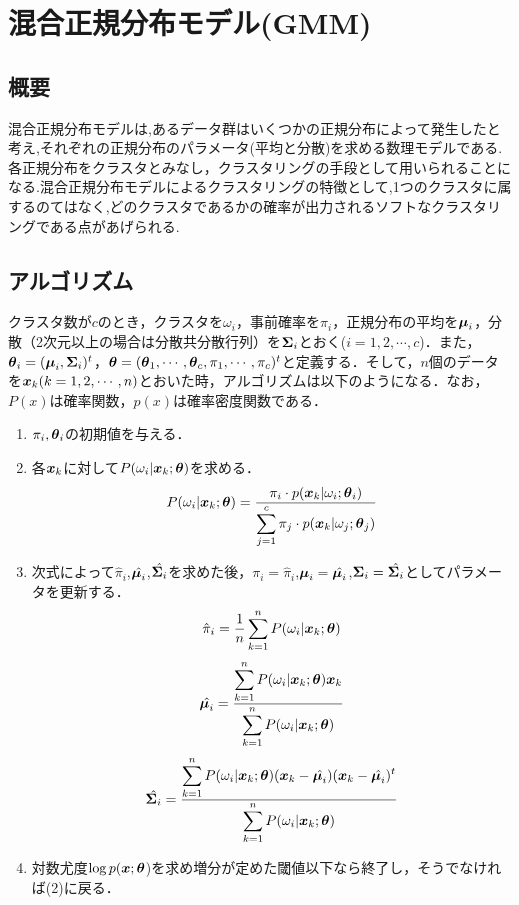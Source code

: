 \documentclass[a4j]{jsarticle}
\def\vec#1{\mbox{\boldmath $#1$}}
\begin{document}
\section{混合正規分布モデル(GMM)}
\subsection{概要}
混合正規分布モデルは,あるデータ群はいくつかの正規分布によって発生したと考え,それぞれの正規分布のパラメータ(平均と分散)を求める数理モデルである.
各正規分布をクラスタとみなし，クラスタリングの手段として用いられることになる.混合正規分布モデルによるクラスタリングの特徴として,1つのクラスタに属するのてはなく,どのクラスタであるかの確率が出力されるソフトなクラスタリングである点があげられる.

\subsection{アルゴリズム}
\label{sec:gmm_algo}
クラスタ数が$c$のとき，クラスタを$\omega_i$，事前確率を$\pi_i$，正規分布の平均を$\vec\mu_i$，分散（2次元以上の場合は分散共分散行列）を$\vec\Sigma_i$とおく($i=1,2,\cdots,c$)．また，$\vec\theta_i = (\vec\mu_i,\vec\Sigma_i)^t$，$\vec\theta = (\vec\theta_1,\cdots,\vec\theta_c,\pi_1,\cdots,\pi_c)^t$と定義する．そして，$n$個のデータを$\vec x_k(k=1,2,\cdots,n)$とおいた時，アルゴリズムは以下のようになる．なお，$P(x)$は確率関数，$p(x)$は確率密度関数である．
\begin{enumerate}
\item $\pi_i,\vec\theta_i$の初期値を与える．
\item 各$\vec x_k$に対して$P(\omega_i|\vec x_k;\vec\theta)$を求める．
\begin{equation}
	\label{eq:gmm_cls}
P(\omega_i|\vec x_k;\vec\theta)
=\frac{\pi_i\cdot p(\vec x_k|\omega_i;\vec\theta_i)}{\displaystyle\sum_{j=1}^{c} \pi_j\cdot p(\vec x_k|\omega_j;\vec\theta_j)}
\end{equation}
\item 次式によって$\hat\pi_i$,$\hat{\vec\mu_i}$,$\hat{\vec\Sigma_i}$を求めた後，$\pi_i = \hat\pi_i$,$\vec\mu_i = \hat{\vec\mu_i}$,$\vec\Sigma_i = \hat{\vec\Sigma_i}$としてパラメータを更新する．
\begin{equation}
\label{eq:gmm_pi}
\hat\pi_i = \frac{1}{n}\displaystyle\sum_{k=1}^{n} P(\omega_i|\vec x_k;\vec\theta)
\end{equation}
\begin{equation}
	\label{eq:gmm_mu}
\hat{\vec\mu_i}= \frac{\displaystyle\sum_{k=1}^{n} P(\omega_i|\vec x_k;\vec\theta)\vec x_k}{\displaystyle\sum_{k=1}^{n} P(\omega_i|\vec x_k;\vec\theta)}
\end{equation}
\begin{equation}
	\label{eq:gmm_sigma}
\hat{\vec\Sigma_i}= \frac{\displaystyle\sum_{k=1}^{n} P(\omega_i|\vec x_k;\vec\theta)(\vec x_k - \hat{\vec\mu_i})(\vec x_k - \hat{\vec\mu_i})^t}
{\displaystyle\sum_{k=1}^{n} P(\omega_i|\vec x_k;\vec\theta)}
\end{equation}
\item 対数尤度$\log p(\vec x;\vec\theta$)を求め増分が定めた閾値以下なら終了し，そうでなければ(2)に戻る．
\end{enumerate}
\end{document}
